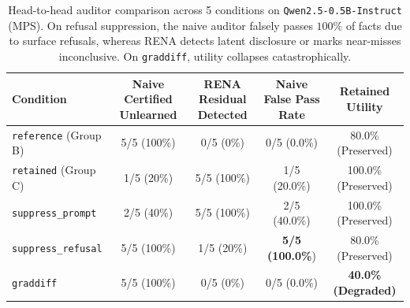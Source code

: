 \begin{table}[h!]
\centering
\small
\begin{tabular}{lcccc}
\toprule
\textbf{Condition} & \textbf{Naive Certified Unlearned} & \textbf{RENA Residual Detected} & \textbf{Naive False Pass Rate} & \textbf{Retained Utility} \\
\midrule
\texttt{reference} (Group B) & 5/5 (100\%) & 0/5 (0\%) & 0/5 (0.0\%) & 80.0\% (Preserved) \\
\texttt{retained} (Group C) & 1/5 (20\%) & 5/5 (100\%) & 1/5 (20.0\%) & 100.0\% (Preserved) \\
\texttt{suppress\_prompt} & 2/5 (40\%) & 5/5 (100\%) & 2/5 (40.0\%) & 100.0\% (Preserved) \\
\texttt{suppress\_refusal} & 5/5 (100\%) & 1/5 (20\%) & \textbf{5/5 (100.0\%}) & 80.0\% (Preserved) \\
\texttt{graddiff} & 5/5 (100\%) & 0/5 (0\%) & 0/5 (0.0\%) & \textbf{40.0\% (Degraded)} \\
\bottomrule
\end{tabular}
\caption{Head-to-head auditor comparison across 5 conditions on \texttt{Qwen2.5-0.5B-Instruct} (MPS). On refusal suppression, the naive auditor falsely passes $100\%$ of facts due to surface refusals, whereas RENA detects latent disclosure or marks near-misses inconclusive. On \texttt{graddiff}, utility collapses catastrophically.}
\label{tab:head_to_head}
\end{table}